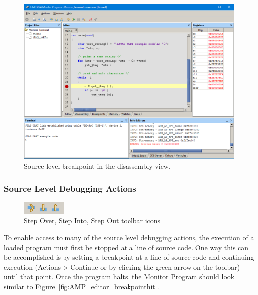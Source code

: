 \documentclass[11pt, twoside, pdftex]{article}
\begin{document}
\begin{figure}[h]
	\begin{center}
		\includegraphics[scale=0.4]{screenshots/AMP_editor_sourcebreakpoint.png}
	\end{center}
	\caption{Source level breakpoint in the disassembly view.}
	\label{fig:AMP_editor_sourcebreakpoint}
\end{figure}

\subsubsection{Source Level Debugging Actions}

\begin{figure}[h]
	\begin{center}
		\includegraphics[scale=1]{screenshots/AMP_debugactionbuttons.png}
	\end{center}
	\caption{Step Over, Step Into, Step Out toolbar icons}
	\label{fig:AMP_debugactionbuttons}
\end{figure}
To enable access to many of the source level debugging actions, the execution of a loaded program must first
be stopped at a line of source code. One way this can be accomplished is by setting a breakpoint at a line of source code
and continuing execution ({\sf Actions > Continue} or by clicking the green arrow on the toolbar) until that point.
Once the program halts, the Monitor Program should look similar to Figure~\ref{fig:AMP_editor_breakpointhit}. 
\end{document}
